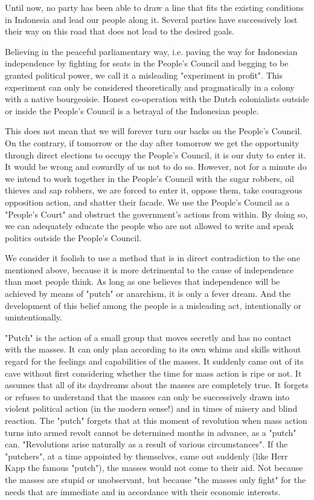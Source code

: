 Until now, no party has been able to draw a line that fits the existing conditions in Indonesia and lead our people along it. 
Several parties have successively lost their way on this road that does not lead to the desired goals.\nline

Believing in the peaceful parliamentary way, i.e. paving the way for Indonesian independence by fighting for 
seats in the People's Council and begging to be granted political power, we call it a misleading "experiment in profit". 
This experiment can only be considered theoretically and pragmatically in a colony with a native bourgeoisie. 
Honest co-operation with the Dutch colonialists outside or inside the People's Council is a betrayal of the Indonesian people.\nline

This does not mean that we will forever turn our backs on the People's Council. On the contrary, if tomorrow or the day after 
tomorrow we get the opportunity through direct elections to occupy the People's Council, it is our duty to enter it. It 
would be wrong and cowardly of us not to do so. However, not for a minute do we intend to work together in the People's 
Council with the sugar robbers, oil thieves and sap robbers, we are forced to enter it, oppose them, take courageous opposition 
action, and shatter their facade. We use the People's Council as a "People's Court" and obstruct the government's actions from within. 
By doing so, we can adequately educate the people who are not allowed to write and speak politics outside the People's Council.\nline

We consider it foolish to use a method that is in direct contradiction to the one mentioned above, because it is more 
detrimental to the cause of independence than most people think. As long as one believes that independence will be achieved 
by means of "putch" or anarchism, it is only a fever dream. And the development of this belief among the people is a 
misleading act, intentionally or unintentionally.\nline

"Putch" is the action of a small group that moves secretly and has no contact with the masses. It can only plan according to 
its own whims and skills without regard for the feelings and capabilities of the masses. It suddenly came out of its cave without 
first considering whether the time for mass action is ripe or not. It assumes that all of its daydreams about the masses are 
completely true. It forgets or refuses to understand that the masses can only be successively drawn into violent political action 
(in the modern sense!) and in times of misery and blind reaction. The "putch" forgets that at this moment of revolution when 
mass action turns into armed revolt cannot be determined months in advance, as a "putch" can. "Revolutions arise naturally as a 
result of various circumstances". If the "putchers", at a time appointed by themselves, came out suddenly (like Herr Kapp the famous "putch"), 
the masses would not come to their aid. Not because the masses are stupid or unobservant, but because "the masses only fight" for 
the needs that are immediate and in accordance with their economic interests.\nline

